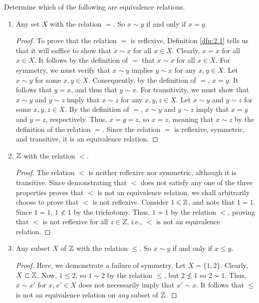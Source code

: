 \documentclass[../main.tex]{subfiles}
\begin{document}
\begin{exercise}\label{exr:2.2}
    Determine which of the following are equivalence relations.
    \begin{enumerate}[label={\alph*)},ref={\theexercise\alph*}]
        \item \label{exr:2.2a}Any set $X$ with the relation $=$. So $x\sim y$ if and only if $x=y$.
        \begin{proof}
            To prove that the relation $=$ is reflexive, Definition \ref{dfn:2.1} tells us that it will suffice to show that $x\sim x$ for all $x\in X$. Clearly, $x=x$ for all $x\in X$. It follows by the definition of $=$ that $x\sim x$ for all $x\in X$. For symmetry, we must verify that $x\sim y$ implies $y\sim x$ for any $x,y\in X$. Let $x\sim y$ for some $x,y\in X$. Consequently, by the definition of $=$, $x=y$. It follows that $y=x$, and thus that $y\sim x$. For transitivity, we must show that $x\sim y$ and $y\sim z$ imply that $x\sim z$ for any $x,y,z\in X$. Let $x\sim y$ and $y\sim z$ for some $x,y,z\in X$. By the definition of $=$, $x\sim y$ and $y\sim z$ imply that $x=y$ and $y=z$, respectively. Thus, $x=y=z$, so $x=z$, meaning that $x\sim z$ by the definition of the relation $=$. Since the relation $=$ is reflexive, symmetric, and transitive, it is an equivalence relation.
        \end{proof}
        \item \label{exr:2.2b}$\mathbb{Z}$ with the relation $<$.
        \begin{proof}
            The relation $<$ is neither reflexive nor symmetric, although it is transitive. Since demonstrating that $<$ does not satisfy any one of the three properties proves that $<$ is not an equivalence relation, we shall arbitrarily choose to prove that $<$ is not reflexive. Consider $1\in\mathbb{Z}$, and note that $1=1$. Since $1=1$, $1\nless 1$ by the trichotomy. Thus, $1\nsim 1$ by the relation $<$, proving that $<$ is not reflexive for all $z\in Z$, i.e., $<$ is not an equivalence relation.
        \end{proof}
        \item \label{exr:2.2c}Any subset $X$ of $\mathbb{Z}$ with the relation $\leq$. So $x\sim y$ if and only if $x\leq y$.
        \begin{proof}
            Here, we demonstrate a failure of symmetry. Let $X=\{1,2\}$. Clearly, $X\subset\mathbb{Z}$. Now, $1\leq 2$, so $1\sim 2$ by the relation $\leq$, but $2\nleq 1$ so $2\nsim 1$. Thus, $x\sim x'$ for $x,x'\in X$ does not necessarily imply that $x'\sim x$. It follows that $\leq$ is not an equivalence relation on \emph{any} subset of $\mathbb{Z}$.

\end{proof}
\end{enumerate}
\end{exercise}
\end{document}
